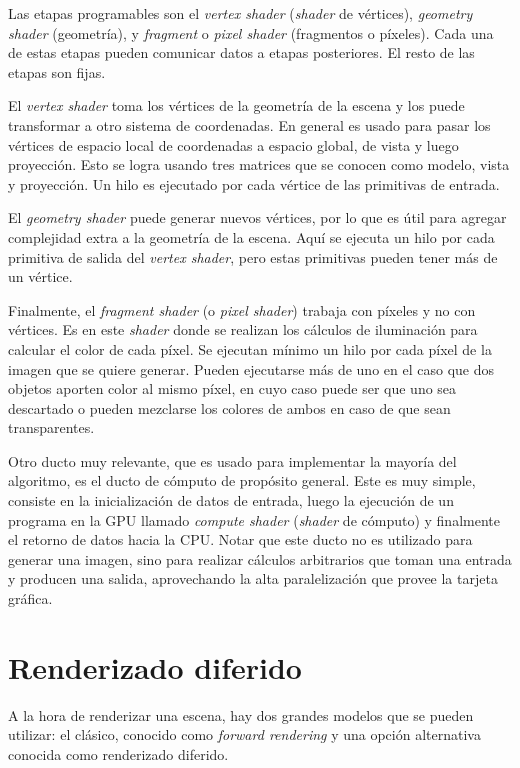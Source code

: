 Las etapas programables son el \textit{vertex shader} (\textit{shader} de vértices), \textit{geometry shader} (geometría), y \textit{fragment} o \textit{pixel shader} (fragmentos o píxeles).
Cada una de estas etapas pueden comunicar datos a etapas posteriores.
El resto de las etapas son fijas.

El \textit{vertex shader} toma los vértices de la geometría de la escena y los puede transformar a otro sistema de coordenadas.
En general es usado para pasar los vértices de espacio local de coordenadas a espacio global, de vista y luego proyección.
Esto se logra usando tres matrices que se conocen como modelo, vista y proyección.
Un hilo es ejecutado por cada vértice de las primitivas de entrada.

El \textit{geometry shader} puede generar nuevos vértices, por lo que es útil para agregar complejidad extra a la geometría de la escena.
Aquí se ejecuta un hilo por cada primitiva de salida del \textit{vertex shader}, pero estas primitivas pueden tener más de un vértice.

Finalmente, el \textit{fragment shader} (o \textit{pixel shader}) trabaja con píxeles y no con vértices.
Es en este \textit{shader} donde se realizan los cálculos de iluminación para calcular el color de cada píxel.
Se ejecutan mínimo un hilo por cada píxel de la imagen que se quiere generar.
Pueden ejecutarse más de uno en el caso que dos objetos aporten color al mismo píxel, en cuyo caso puede ser que uno sea descartado o pueden mezclarse los colores de ambos en caso de que sean transparentes.

Otro ducto muy relevante, que es usado para implementar la mayoría del algoritmo, es el ducto de cómputo de propósito general.
Este es muy simple, consiste en la inicialización de datos de entrada, luego la ejecución de un programa en la GPU llamado \textit{compute shader} (\textit{shader} de cómputo) y finalmente el retorno de datos hacia la CPU.
Notar que este ducto no es utilizado para generar una imagen, sino para realizar cálculos arbitrarios que toman una entrada y producen una salida, aprovechando la alta paralelización que provee la tarjeta gráfica.

\section{Renderizado diferido}\label{sec:deferred-rendering}

A la hora de renderizar una escena, hay dos grandes modelos que se pueden utilizar: el clásico, conocido como \textit{forward rendering} y una opción alternativa conocida como renderizado diferido.

